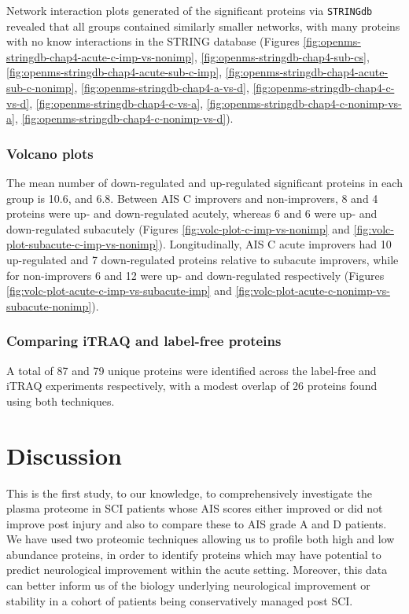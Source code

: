 \documentclass[9pt,lineno]{elife}
\begin{document}
Network interaction plots generated of the significant proteins via \texttt{STRINGdb} revealed that all groups contained similarly smaller networks, with many proteins with no know interactions in the STRING database (Figures \ref{fig:openms-stringdb-chap4-acute-c-imp-vs-nonimp}, \ref{fig:openms-stringdb-chap4-sub-cs}, \ref{fig:openms-stringdb-chap4-acute-sub-c-imp}, \ref{fig:openms-stringdb-chap4-acute-sub-c-nonimp}, \ref{fig:openms-stringdb-chap4-a-vs-d}, \ref{fig:openms-stringdb-chap4-c-vs-d}, \ref{fig:openms-stringdb-chap4-c-vs-a}, \ref{fig:openms-stringdb-chap4-c-nonimp-vs-a}, \ref{fig:openms-stringdb-chap4-c-nonimp-vs-d}).

\hypertarget{volcano-plots}{%
\subsubsection{Volcano plots}\label{volcano-plots}}

The mean number of down-regulated and up-regulated significant proteins in each group is 10.6, and 6.8.
Between AIS C improvers and non-improvers, 8 and 4 proteins were up- and down-regulated acutely, whereas 6 and 6 were up- and down-regulated subacutely (Figures \ref{fig:volc-plot-c-imp-vs-nonimp} and \ref{fig:volc-plot-subacute-c-imp-vs-nonimp}).
Longitudinally, AIS C acute improvers had 10 up-regulated and 7 down-regulated proteins relative to subacute improvers, while for non-improvers 6 and 12 were up- and down-regulated respectively (Figures \ref{fig:volc-plot-acute-c-imp-vs-subacute-imp} and \ref{fig:volc-plot-acute-c-nonimp-vs-subacute-nonimp}).

\hypertarget{comparing-itraq-and-label-free-proteins}{%
\subsubsection{Comparing iTRAQ and label-free proteins}\label{comparing-itraq-and-label-free-proteins}}

A total of 87 and 79 unique proteins were identified across the label-free and iTRAQ experiments respectively, with a modest overlap of 26 proteins found using both techniques.



\hypertarget{discussion}{%
\section{Discussion}\label{discussion}}

This is the first study, to our knowledge, to comprehensively investigate the plasma proteome in SCI patients whose AIS scores either improved or did not improve post injury and also to compare these to AIS grade A and D patients.
We have used two proteomic techniques allowing us to profile both high and low abundance proteins, in order to identify proteins which may have potential to predict neurological improvement within the acute setting.
Moreover, this data can better inform us of the biology underlying neurological improvement or stability in a cohort of patients being conservatively managed post SCI.
\end{document}

